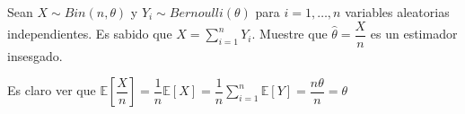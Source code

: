 
\question[5] Sean $X\sim Bin(n,\theta)$ y $Y_i \sim Bernoulli(\theta)$ para $i=1,\dots,n$ variables aleatorias independientes. Es sabido que $X=\sum_{i=1}^{n} Y_i$. Muestre que $\hat{\theta}=\dfrac{X}{n}$ es un estimador insesgado. 

\begin{solution}
Es claro ver que $\mathbb{E}\left[\dfrac{X}{n}\right]=\dfrac{1}{n}\mathbb{E}\left[X\right]=\dfrac{1}{n}\displaystyle \sum_{i=1}^{n}\mathbb{E}[Y]=\dfrac{n\theta}{n}=\theta$
\end{solution}
